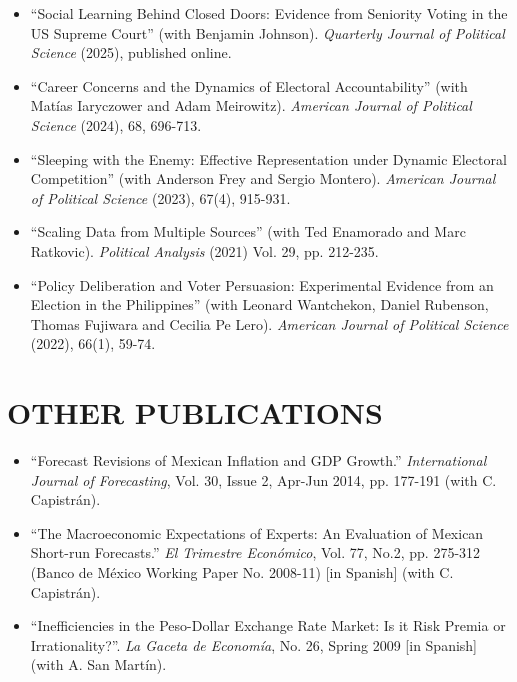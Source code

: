 \documentclass[margin, 10pt]{res} %
\begin{document}
\begin{resume}
\begin{itemize}
\item[-] ``Social Learning Behind Closed Doors: Evidence from
  Seniority Voting in the US Supreme Court'' (with Benjamin
  Johnson). \emph{Quarterly Journal of Political Science} (2025),
  published online.\\

  \item[-] ``Career Concerns and the Dynamics of Electoral
  Accountability'' (with Mat\'{i}as Iaryczower and Adam
  Meirowitz). \emph{American Journal of Political Science} (2024), 68, 696-713.\\

\item[-] ``Sleeping with the Enemy: Effective Representation
under Dynamic Electoral Competition'' (with Anderson Frey
and Sergio Montero). \emph{American Journal of Political Science} (2023), 67(4), 915-931.\\

\item[-] ``Scaling Data from Multiple Sources'' (with Ted Enamorado and Marc
    Ratkovic). \emph{Political Analysis} (2021) Vol. 29, pp. 212-235.\\


 \item[-] ``Policy Deliberation and Voter Persuasion: Experimental
  Evidence from an Election in the Philippines'' (with Leonard
  Wantchekon, Daniel Rubenson, Thomas Fujiwara and Cecilia Pe
  Lero). \emph{American Journal of Political Science} (2022), 66(1), 59-74.\\
\end{itemize}
\section{OTHER PUBLICATIONS}
\begin{itemize} \itemsep -2pt
\item[-] ``Forecast Revisions of Mexican Inflation and GDP Growth.''
\emph{International Journal of Forecasting}, Vol. 30, Issue 2, Apr-Jun
2014, pp. 177-191 (with C. Capistr\'{a}n).\\

\item[-] ``The Macroeconomic Expectations of Experts: An Evaluation of Mexican
Short-run Forecasts.'' \emph{El Trimestre Econ\'{o}mico}, Vol. 77,
No.2, pp. 275-312 (Banco de M\'{e}xico Working Paper No. 2008-11) [in
Spanish] (with C. Capistr\'{a}n).\\

\item[-] ``Inefficiencies in the Peso-Dollar Exchange Rate
  Market: Is it Risk Premia or Irrationality?''. \emph{La Gaceta de
    Econom\'{i}a}, No. 26, Spring 2009 [in Spanish] (with A. San Mart\'{i}n).
\end{itemize}


\end{resume}
\end{document}
